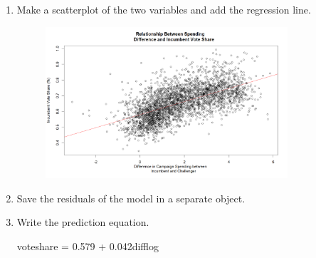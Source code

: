 \documentclass[12pt,letterpaper]{article}
\begin{document}
\begin{enumerate}
		\newpage
		\item Make a scatterplot of the two variables and add the regression line. 	
	
		\begin{figure}[h!]
		\centering
		\caption{\footnotesize}
		\label{fig:plot_1}
		\includegraphics[width=0.85\textwidth]{Plot1}  
	\end{figure}
	\newpage
		\item Save the residuals of the model in a separate object.	\vspace{4cm}
		\item Write the prediction equation.
		
		\noindent 
		
		voteshare = 0.579 + 0.042difflog 
	\end{enumerate}
	
\newpage
\end{document}
